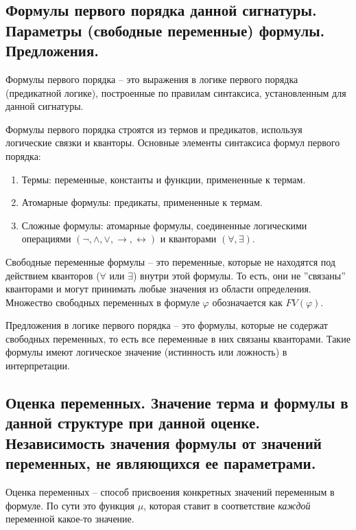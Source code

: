 \documentclass[a4paper, 10pt]{article}
\begin{document}
\subsection{Формулы первого порядка данной сигнатуры. Параметры (свободные переменные)
формулы. Предложения.}

Формулы первого порядка -- это выражения в логике первого порядка (предикатной логике), построенные по правилам синтаксиса, установленным для данной сигнатуры.

Формулы первого порядка строятся из термов и предикатов, используя логические связки и кванторы. Основные элементы синтаксиса формул первого порядка:
\begin{enumerate}
    \item Термы: переменные, константы и функции, примененные к термам.
    \item Атомарные формулы: предикаты, примененные к термам.
    \item Сложные формулы: атомарные формулы, соединенные логическими операциями $(\lnot, \land, \lor, \to, \leftrightarrow)$ и кванторами $(\forall, \exists)$.
\end{enumerate}

Свободные переменные формулы -- это переменные, которые не находятся под действием кванторов ($\forall$ или $\exists$) внутри этой формулы. То есть, они не ''связаны'' кванторами и могут принимать любые значения из области определения. Множество свободных переменных в формуле $\varphi$ обозначается как $FV(\varphi)$.

Предложения в логике первого порядка -- это формулы, которые не содержат свободных переменных, то есть все переменные в них связаны кванторами. Такие формулы имеют логическое значение (истинность или ложность) в интерпретации.

\subsection{Оценка переменных. Значение терма и формулы в данной структуре при данной оценке. Независимость значения формулы от значений переменных, не являющихся ее параметрами.}

Оценка переменных -- способ присвоения конкретных значений переменным в формуле. По сути это функция $\mu$, которая ставит в соответствие \textit{каждой} переменной какое-то значение.
\end{document}

